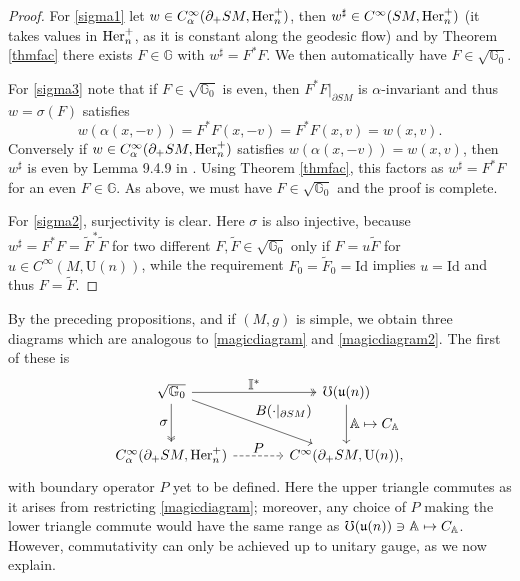 \documentclass[JEP,XML,SOM,Unicode,published]{cedram}
\newcommand\mto{\mathchoice{\longmapsto}{\mapsto}{\mapsto}{\mapsto}}
\let\ts\textstyle
\newcommand{\rU}{\mathrm{U}}
\theoremstyle{plain}
\theoremstyle{definition}
\newcommand{\A}{\mathbb{A}}
\newcommand{\G}{\mathbb{G}}
\newcommand{\I}{\mathbb{I}}
\renewcommand{\u}{\mathfrak{u}}
\newcommand{\he}{\textup{Her}}
\newcommand{\Id}{\mathrm{Id}}
\newcommand{\1}{{\bf 1}}
\begin{document}
\begin{proof}
For \eqref{sigma1} let $w\in C_\alpha^\infty(\partial_+SM,\he^+_n)$, then $w^\sharp\in C^\infty(SM,\he^+_n)$ (it takes values in $\he^+_n$, as it is constant along the geodesic flow)
and by Theorem \ref{thmfac} there exists $F\in \G$ with $w^\sharp =F^*F$. We then automatically have $F\in \sqrt{\G_0}$.

For \eqref{sigma3} note that if $F\in \sqrt{\G_0}$ is even, then $F^*F\vert_{\partial SM}$ is $\alpha$-invariant and thus $w=\sigma(F)$ satisfies
\begin{equation*}
w(\alpha(x,-v)) = F^*F(x,-v) = F^*F(x,v) = w(x,v).
\end{equation*}
Conversely if $w\in C_\alpha^\infty(\partial_+SM,\he^+_n)$ satisfies $w(\alpha(x,-v))=w(x,v)$, then $w^\sharp$ is even by Lemma 9.4.9 in \cite{PSU20}. Using Theorem \ref{thmfac}, this factors as $w^\sharp =F^*F$ for an even $F\in\G$. As above, we must have $F\in \sqrt{\G_0}$ and the proof is complete.

For \eqref{sigma2}, surjectivity is clear. Here $\sigma$ is also injective, because $w^\sharp = F^*F = \tilde F^*\tilde F$ for two different $F,\tilde F\in \sqrt{\G_0}$ only if $F = u \tilde F $ for $u\in C^\infty(M,\rU(n))$, while the requirement $F_0=\tilde F_0=\Id$ implies $u=\Id$ and thus $F=\tilde F$.
\end{proof}

By the preceding propositions, and if $(M,g)$ is simple, we obtain three diagrams which are analogous to \eqref{magicdiagram} and \eqref{magicdiagram2}. The first of these is
\begin{equation}\label{magicdiagram3}
\begin{tikzcd}[sep = large]
\sqrt{\G_0} \arrow[two heads]{r}{\ts\I^*} \arrow{dr}{\ts B(\cdot\vert_{\partial SM})}\arrow[swap, two heads]{d}{\ts\sigma} & \mho(\u(n)) \arrow{d}{\ts\A\mto C_\A} \\
C_\alpha^\infty(\partial_+SM,\he^+_n) \arrow[dashed]{r}{\ts P} & C^\infty(\partial_+SM,\rU(n)),
\end{tikzcd}
\end{equation}
with boundary operator $P$ yet to be defined. Here the upper triangle commutes as it arises from restricting \eqref{magicdiagram}; moreover, any choice of $P$ making the lower triangle commute would have the same range as $\mho(\u(n))\ni \A\mto C_\A$. However, commutativity can only be achieved up to unitary gauge, as we now explain.

\smallskip
\end{document}
